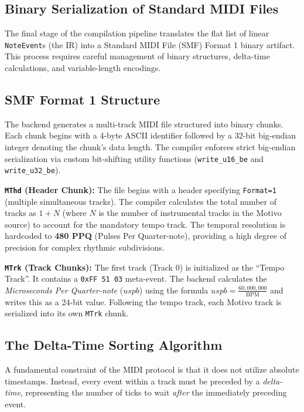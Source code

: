 \subsection{Binary Serialization of Standard MIDI Files}\label{subsec:midi-binary-serialization}

The final stage of the compilation pipeline translates the flat list of linear \texttt{NoteEvent}s (the IR) into a
Standard MIDI File (SMF) Format 1 binary artifact.
This process requires careful management of binary structures, delta-time calculations, and variable-length encodings.

\subsection{SMF Format 1 Structure}\label{detail-subsec:smf-format-1-structure}

The backend generates a multi-track MIDI file structured into binary chunks.
Each chunk begins with a 4-byte ASCII identifier followed by a 32-bit big-endian integer denoting the chunk's data
length.
The compiler enforces strict big-endian serialization via custom bit-shifting utility functions (\texttt{write\_u16\_be}
and \texttt{write\_u32\_be}).

\noindent \textbf{\texttt{MThd} (Header Chunk):} The file begins with a header specifying \texttt{Format=1}
(multiple simultaneous tracks).
The compiler calculates the total number of tracks as $1 + N$ (where $N$ is the number of instrumental tracks in the
Motivo source) to account for the mandatory tempo track.
The temporal resolution is hardcoded to \textbf{480 PPQ} (Pulses Per Quarter-note), providing a high degree of
precision for complex rhythmic subdivisions.

\noindent \textbf{\texttt{MTrk} (Track Chunks):} The first track (Track 0) is initialized as the ``Tempo Track''.
It contains a \texttt{0xFF 51 03} meta-event.
The backend calculates the \textit{Microseconds Per Quarter-note} ($uspb$) using the formula $uspb =
\frac{60,000,000}{\mathrm{BPM}}$ and writes this as a 24-bit value.
Following the tempo track, each Motivo track is serialized into its own \texttt{MTrk} chunk.

\subsection{The Delta-Time Sorting Algorithm}\label{detail-subsec:the-delta-time-sorting-algorithm}

A fundamental constraint of the MIDI protocol is that it does not utilize absolute timestamps.
Instead, every event within a track must be preceded by a \textit{delta-time}, representing the number of ticks to wait
\textit{after} the immediately preceding event.

